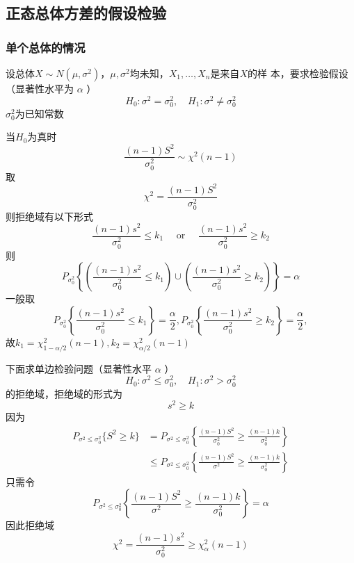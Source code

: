 \documentclass[11pt]{article}
\begin{document}
\subsection{正态总体方差的假设检验}
\label{sec:org8ab6ccb}
\subsubsection{单个总体的情况}
\label{sec:orgbd093bf}
设总体\(X\sim N(\mu,\sigma^2)\)，\(\mu,\sigma^2\)均未知，\(X_1,\dots,X_n\)是来自\(X\)的样
本，要求检验假设（显著性水平为 \(\alpha\) ）
\begin{equation*}
H_0:\sigma^2=\sigma_0^2,\quad H_1:\sigma^2\neq\sigma_0^2
\end{equation*}
\(\sigma_0^2\)为已知常数

当\(H_0\)为真时
\begin{equation*}
\frac{(n-1)S^2}{\sigma^2_0}\sim\chi^2(n-1)
\end{equation*}
取
\begin{equation*}
\chi^2=\frac{(n-1)S^2}{\sigma_0^2}
\end{equation*}
则拒绝域有以下形式
\begin{equation*}
\frac{(n-1)s^2}{\sigma_0^2}\le k_1 \quad\text{ or }\quad
\frac{(n-1)s^2}{\sigma_0^2}\ge k_2
\end{equation*}
则
\begin{equation*}
P_{\sigma^2_0}\left\{
\left(\frac{(n-1)s^2}{\sigma_0^2}\le k_1\right)\cup
\left(\frac{(n-1)s^2}{\sigma_0^2}\ge k_2\right)
\right\}=\alpha
\end{equation*}
一般取
\begin{equation*}
P_{\sigma_0^2}\left\{\frac{(n-1)s^2}{\sigma_0^2}\le k_1\right\}=\frac{\alpha}{2},
P_{\sigma_0^2}\left\{\frac{(n-1)s^2}{\sigma_0^2}\ge k_2\right\}=\frac{\alpha}{2},
\end{equation*}
故\(k_1=\chi_{1-\alpha/2}^2(n-1),k_2=\chi_{\alpha/2}^2(n-1)\)

下面求单边检验问题（显著性水平 \(\alpha\) ）
\begin{equation*}
H_0:\sigma^2\le\sigma_0^2,\quad H_1:\sigma^2>\sigma_0^2
\end{equation*}
的拒绝域，拒绝域的形式为
\begin{equation*}
s^2\ge k
\end{equation*}
因为
\begin{align*}
P_{\sigma^2\le\sigma_0^2}\{S^2\ge k\}&=
P_{\sigma^2\le\sigma_0^2}\left\{
\frac{(n-1)S^2}{\sigma_0^2}\ge \frac{(n-1)k}{\sigma_0^2}
\right\}\\
&\le P_{\sigma^2\le\sigma_0^2}\left\{
\frac{(n-1)S^2}{\sigma^2}\ge \frac{(n-1)k}{\sigma_0^2}
\right\}
\end{align*}
只需令
\begin{equation*}
P_{\sigma^2\le\sigma_0^2}\left\{\frac{(n-1)S^2}{\sigma^2}\ge \frac{(n-1)k}{\sigma_0^2}
\right\}=\alpha
\end{equation*}
因此拒绝域
\begin{equation*}
\chi^2=\frac{(n-1)s^2}{\sigma_0^2}\ge\chi_{\alpha}^2(n-1)
\end{equation*}
\end{document}
